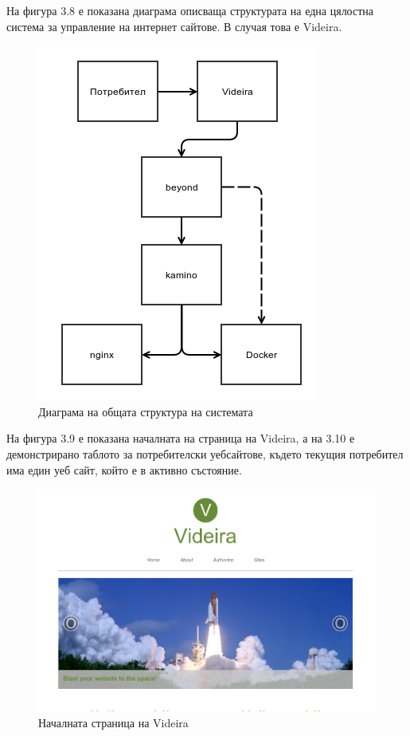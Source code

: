 \documentclass[pdftex,14pt,a4paper]{extreport}
\begin{document}
На фигура 3.8 е показана диаграма описваща структурата на една цялостна система за управление на интернет сайтове. В случая това е Videira.
\begin{figure}[h]
  \centering
  \includegraphics [scale=0.7]{./diagram_all}
  \caption {Диаграма на общата структура на системата}
\end{figure}
На фигура 3.9 е показана началната на страница на Videira, а на 3.10 е демонстрирано таблото за потребителски уебсайтове, където текущия потребител има един уеб сайт, който е в активно състояние.
\begin{figure}[h]
  \centering
  \includegraphics [scale=0.42]{./videira_index}
  \caption {Началната страница на Videira}
\end{figure}
\end{document}
